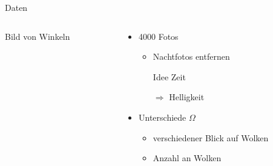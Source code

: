 \begin{frame}[t]{Daten}
  \begin{columns}
    \begin{column}{0.3\textwidth}
      Bild von Winkeln
    \end{column}
    \begin{column}{0.7\textwidth}
      \begin{itemize}
        \item 4000 Fotos
          \begin{itemize}
            \item Nachtfotos entfernen
            \item[Idee] Zeit
            \item[$\Rightarrow$] Helligkeit
          \end{itemize}
        \item Unterschiede $\Omega$
          \begin{itemize}
            \item verschiedener Blick auf Wolken
            \item Anzahl an Wolken
          \end{itemize}
      \end{itemize}
    \end{column}
  \end{columns}
\end{frame}
